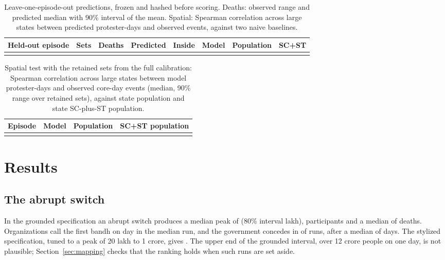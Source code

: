 \documentclass[11pt,a4paper]{article}
\begin{document}
\begin{table}[H]
\centering\small
\caption{Leave-one-episode-out predictions, frozen and hashed before scoring. Deaths: observed range and predicted median with 90\% interval of the mean. Spatial: Spearman correlation across large states between predicted protester-days and observed events, against two naive baselines.}
\label{tab:loeo}
\begin{tabularx}{\linewidth}{@{}Lrrrcrrr@{}}
\toprule
Held-out episode & Sets & Deaths & Predicted & Inside & Model & Population & SC+ST\\
\midrule
{}
\bottomrule
\end{tabularx}
\end{table}

\begin{table}[H]
\centering\small
\caption{Spatial test with the retained sets from the full calibration: Spearman correlation across large states between model protester-days and observed core-day events (median, 90\% range over retained sets), against state population and state SC-plus-ST population.}
\label{tab:spatial}
\begin{tabularx}{\linewidth}{@{}Lrrr@{}}
\toprule
Episode & Model & Population & SC+ST population\\
\midrule
{}
\bottomrule
\end{tabularx}
\end{table}

\section{Results}
\label{sec:results}

\subsection{The abrupt switch}
In the grounded specification an abrupt switch produces a median peak of \PeakGroundedBaseline{} (80\% interval \PeakRangeGroundedBaseline{} lakh), \CumulativeGroundedBaseline{} participants and a median of \DeathsGroundedBaseline{} deaths. Organizations call the first bandh on day \GroundedFirstBandhDay{} in the median run, and the government concedes in \GroundedConcededShare{} of runs, after a median of \GroundedConcessionDay{} days. The stylized specification, tuned to a peak of 20 lakh to 1 crore, gives \PeakCentralBaseline{}. The upper end of the grounded interval, over 12 crore people on one day, is not plausible; Section~\ref{sec:mapping} checks that the ranking holds when such runs are set aside.
\end{document}
